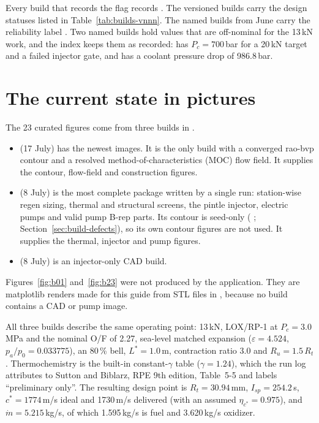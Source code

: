 Every build that records the flag records  . The versioned builds carry the design statuses listed in Table~\ref{tab:builds-vnnn}. The named builds from June carry the reliability label . Two named builds hold values that are off-nominal for the 13\,kN work, and the index keeps them as recorded:  has $P_c = 700$\,bar for a 20\,kN target and a failed injector gate, and  has a coolant pressure drop of 986.8\,bar.

\section{The current state in pictures}\label{sec:builds-pictures}

The 23 curated figures come from three builds in .

\begin{itemize}
\item {} (17 July) has the newest images. It is the only build with a converged rao-bvp contour and a resolved method-of-characteristics (MOC) flow field. It supplies the contour, flow-field and construction figures.
\item {} (8 July) is the most complete package written by a single run: station-wise regen sizing, thermal and structural screens, the pintle injector, electric pumps and valid pump B-rep parts. Its contour is seed-only ( ; Section~\ref{sec:build-defects}), so its own contour figures are not used. It supplies the thermal, injector and pump figures.
\item {} (8 July) is an injector-only CAD build.
\end{itemize}

Figures~\ref{fig:b01} and~\ref{fig:b23} were not produced by the application. They are matplotlib renders made for this guide from STL files in , because no build contains a CAD or pump image.

All three builds describe the same operating point: 13\,kN, LOX/RP-1 at $P_c = 3.0$\,MPa and the nominal O/F of 2.27, sea-level matched expansion ($\varepsilon = 4.524$, $p_a/p_0 = 0.033775$), an 80\,\% bell, $L^* = 1.0$\,m, contraction ratio 3.0 and $R_u = 1.5\,R_t$. Thermochemistry is the built-in constant-$\gamma$ table ($\gamma = 1.24$), which the run log attributes to Sutton and Biblarz, RPE 9th edition, Table~5-5 and labels ``preliminary only''. The resulting design point is $R_t = 30.94$\,mm, $I_{sp} = 254.2$\,s, $c^* = 1774$\,m/s ideal and 1730\,m/s delivered (with an assumed $\eta_{c^*} = 0.975$), and $\dot m = 5.215$\,kg/s, of which 1.595\,kg/s is fuel and 3.620\,kg/s oxidizer.

